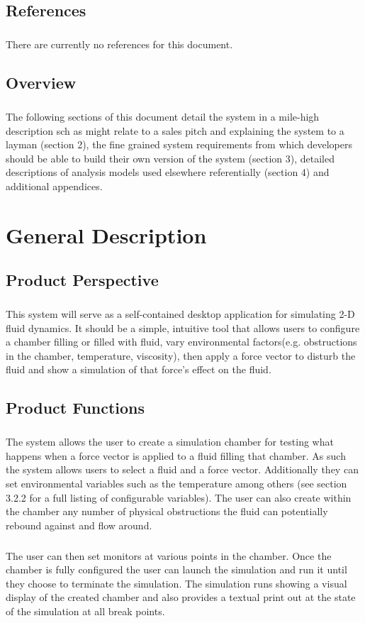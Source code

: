 \documentclass{scrartcl}
\begin{document}
\subsection{References}
\subparagraph{}
There are currently no references for this document.

\subsection{Overview}
\subparagraph{}
The following sections of this document detail the system in a mile-high description sch as might relate to a sales pitch and explaining the system to a layman (section 2), the fine grained system requirements from which developers should be able to build their own version of the system (section 3), detailed descriptions of analysis models used elsewhere referentially (section 4) and additional appendices. 


\section{General Description}
\subsection{Product Perspective}
\subparagraph{}
This system will serve as a self-contained desktop application for simulating 2-D fluid dynamics. It should be a simple, intuitive tool that allows users to configure a chamber filling or filled with fluid, vary environmental factors(e.g. obstructions in the chamber, temperature, viscosity), then apply a force vector to disturb the fluid and show a simulation of that force’s effect on the fluid.

\subsection{Product Functions}
\subparagraph{}
The system allows the user to create a simulation chamber for testing what happens when a  force vector is applied to a fluid filling that chamber. As such the system allows users to select a fluid and a force vector. Additionally they can set environmental variables such as the temperature among others (see section 3.2.2 for a full listing of configurable variables). The user can also create within the chamber any number of physical obstructions the fluid can potentially rebound against and flow around. 

\subparagraph{}
The user can then set monitors at various points in the chamber. Once the chamber is fully  configured the user can launch the simulation and run it until they choose to terminate the simulation. The simulation runs showing a visual display of the created chamber and also provides a textual print out at the state of the simulation at all break points.
\end{document}
